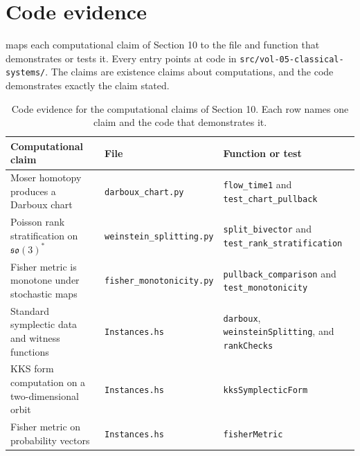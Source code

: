 \documentclass[11pt,letterpaper]{article}
\theoremstyle{definition}
\theoremstyle{remark}
\begin{document}
\appendix
\section{Code evidence}
\label{app:code}

 maps each computational claim of Section 10 to the file and function that demonstrates or tests it. Every entry points at code in \texttt{src/vol-05-classical-systems/}. The claims are existence claims about computations, and the code demonstrates exactly the claim stated.

\begin{table}[h]
\centering
\small
\begin{tabularx}{\textwidth}{L{5.0cm}L{4.2cm}X}
\toprule
Computational claim & File & Function or test \\
\midrule
Moser homotopy produces a Darboux chart & \texttt{darboux\_chart.py} & \texttt{flow\_time1} and \texttt{test\_chart\_pullback} \\
Poisson rank stratification on $\mathfrak{so}(3)^{*}$ & \texttt{weinstein\_splitting.py} & \texttt{split\_bivector} and \texttt{test\_rank\_stratification} \\
Fisher metric is monotone under stochastic maps & \texttt{fisher\_monotonicity.py} & \texttt{pullback\_comparison} and \texttt{test\_monotonicity} \\
Standard symplectic data and witness functions & \texttt{Instances.hs} & \texttt{darboux}, \texttt{weinsteinSplitting}, and \texttt{rankChecks} \\
KKS form computation on a two-dimensional orbit & \texttt{Instances.hs} & \texttt{kksSymplecticForm} \\
Fisher metric on probability vectors & \texttt{Instances.hs} & \texttt{fisherMetric} \\
\bottomrule
\end{tabularx}
\caption{Code evidence for the computational claims of Section 10. Each row names one claim and the code that demonstrates it.}
\label{tab:code-evidence}
\end{table}
\end{document}
